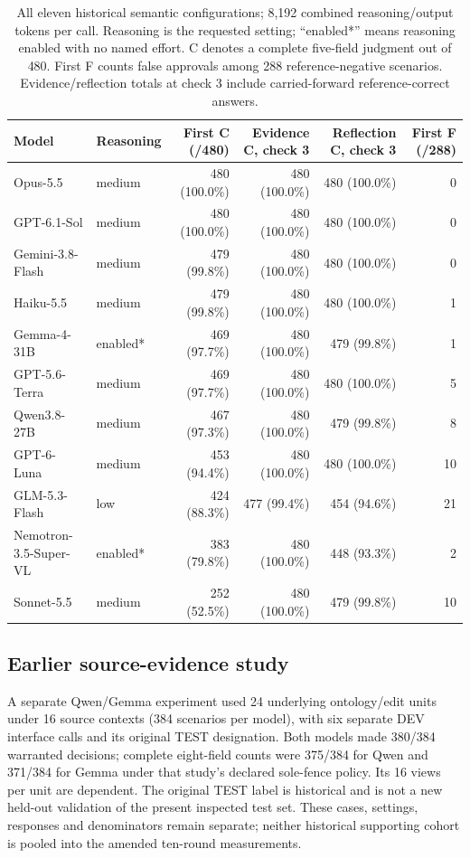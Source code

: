 \documentclass[a4paper,preprint,12pt,numbers,nopreprintline]{elsarticle}
\begin{document}
\begin{table}[htbp]\centering\scriptsize
\caption{All eleven historical semantic configurations; 8,192 combined reasoning/output tokens per call. Reasoning is the requested setting; ``enabled*'' means reasoning enabled with no named effort. C denotes a complete five-field judgment out of 480. First F counts false approvals among 288 reference-negative scenarios. Evidence/reflection totals at check 3 include carried-forward reference-correct answers.}\label{tab:l1-historical-feedback}
\setlength{\tabcolsep}{4pt}
\begin{tabular}{llrrrr}\toprule Model & Reasoning & First C (/480) & Evidence C, check 3 & Reflection C, check 3 & First F (/288)\\\midrule
Opus-5.5 & medium & 480 (100.0\%) & 480 (100.0\%) & 480 (100.0\%) & 0\\
GPT-6.1-Sol & medium & 480 (100.0\%) & 480 (100.0\%) & 480 (100.0\%) & 0\\
Gemini-3.8-Flash & medium & 479 (99.8\%) & 480 (100.0\%) & 480 (100.0\%) & 0\\
Haiku-5.5 & medium & 479 (99.8\%) & 480 (100.0\%) & 480 (100.0\%) & 1\\
Gemma-4-31B & enabled* & 469 (97.7\%) & 480 (100.0\%) & 479 (99.8\%) & 1\\
GPT-5.6-Terra & medium & 469 (97.7\%) & 480 (100.0\%) & 480 (100.0\%) & 5\\
Qwen3.8-27B & medium & 467 (97.3\%) & 480 (100.0\%) & 479 (99.8\%) & 8\\
GPT-6-Luna & medium & 453 (94.4\%) & 480 (100.0\%) & 480 (100.0\%) & 10\\
GLM-5.3-Flash & low & 424 (88.3\%) & 477 (99.4\%) & 454 (94.6\%) & 21\\
Nemotron-3.5-Super-VL & enabled* & 383 (79.8\%) & 480 (100.0\%) & 448 (93.3\%) & 2\\
Sonnet-5.5 & medium & 252 (52.5\%) & 480 (100.0\%) & 479 (99.8\%) & 10\\
\bottomrule\end{tabular}\end{table}

\subsection{Earlier source-evidence study}
A separate Qwen/Gemma experiment used 24 underlying ontology/edit units under 16 source contexts (384 scenarios per model), with six separate DEV interface calls and its original TEST designation. Both models made 380/384 warranted decisions; complete eight-field counts were 375/384 for Qwen and 371/384 for Gemma under that study's declared sole-fence policy. Its 16 views per unit are dependent. The original TEST label is historical and is not a new held-out validation of the present inspected test set. These cases, settings, responses and denominators remain separate; neither historical supporting cohort is pooled into the amended ten-round measurements.
\end{document}

